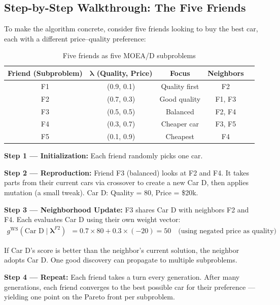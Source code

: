 \documentclass[12pt,a4paper]{article}
\begin{document}
\subsection{Step-by-Step Walkthrough: The Five Friends}

To make the algorithm concrete, consider five friends looking to buy the best car, each with a different price--quality preference:

\begin{table}[H]
\centering
\caption{Five friends as five MOEA/D subproblems}
\label{tab:five_friends}
\renewcommand{\arraystretch}{1.3}
\begin{tabular}{ccccc}
\toprule
\textbf{Friend (Subproblem)} & $\boldsymbol{\lambda}$ (Quality, Price) & \textbf{Focus} & \textbf{Neighbors} \\
\midrule
F1 & (0.9, 0.1) & Quality first & F2 \\
F2 & (0.7, 0.3) & Good quality  & F1, F3 \\
F3 & (0.5, 0.5) & Balanced      & F2, F4 \\
F4 & (0.3, 0.7) & Cheaper car   & F3, F5 \\
F5 & (0.1, 0.9) & Cheapest      & F4 \\
\bottomrule
\end{tabular}
\end{table}

\textbf{Step 1 --- Initialization:} Each friend randomly picks one car.

\textbf{Step 2 --- Reproduction:} Friend F3 (balanced) looks at F2 and F4. It takes parts from their current cars via crossover to create a new Car D, then applies mutation (a small tweak). Car D: Quality = 80, Price = \$20k.

\textbf{Step 3 --- Neighborhood Update:} F3 shares Car D with neighbors F2 and F4. Each evaluates Car D using their own weight vector:
\begin{align}
    g^{\text{WS}}(\text{Car D} \mid \boldsymbol{\lambda}^{F2}) &= 0.7 \times 80 + 0.3 \times (-20) = 50 \quad \text{(using negated price as quality)}
\end{align}

If Car D's score is better than the neighbor's current solution, the neighbor adopts Car D. One good discovery can propagate to multiple subproblems.

\textbf{Step 4 --- Repeat:} Each friend takes a turn every generation. After many generations, each friend converges to the best possible car for their preference --- yielding one point on the Pareto front per subproblem.
\end{document}
